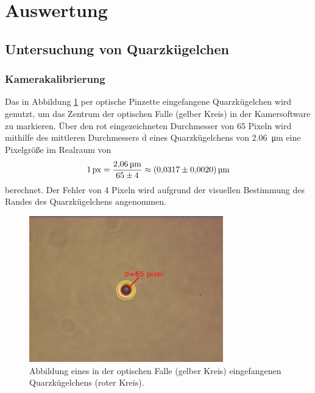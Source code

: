 \newpage
\section{Auswertung}

    \subsection{Untersuchung von Quarzkügelchen}
        \subsubsection{Kamerakalibrierung}
        \label{sec:Pixel}
            Das in Abbildung \ref{fig:cal_cam} per optische Pinzette eingefangene Quarzkügelchen wird genutzt, um das Zentrum der optischen Falle (gelber Kreis) in der Kamersoftware zu markieren. Über den
            rot eingezeichneten Durchmesser von 65 Pixeln wird mithilfe des mittleren Durchmessers $\overline{\text{d}}$ eines Quarzkügelchens von \SI{2.06}{\micro\metre} eine Pixelgröße im Realraum von 
            \begin{equation*}
                1\,\text{px} = \frac{\SI{2.06}{\micro\metre}}{65\pm4} \approx \SI{0.0317 +- 0.0020}{\micro\metre}
            \end{equation*}
            berechnet. Der Fehler von 4 Pixeln wird aufgrund der visuellen Bestimmung des Randes des Quarzkügelchens angenommen.
            \begin{figure}[h]
            \centering
            \includegraphics[width = 0.75\textwidth]{pictures/cal_cam.png}
            \caption{Abbildung eines in der optischen Falle (gelber Kreis) eingefangenen Quarzkügelchens (roter Kreis).}
            \label{fig:cal_cam}
            \end{figure}
            \FloatBarrier

